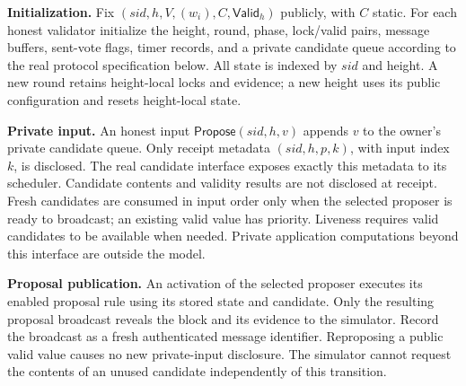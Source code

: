 \documentclass[conference,letterpaper,10pt]{IEEEtran}
\begin{document}
\begin{myframebox}[title={ $\mathcal{F}_{\scriptscriptstyle\mathsf{Tendermint}}$: height and proposal management}]
\textbf{Initialization.} Fix $(sid,h,V,(w_i),C,\mathsf{Valid}_h)$ publicly, with $C$ static. For each honest validator initialize the height, round, phase, lock/valid pairs, message buffers, sent-vote flags, timer records, and a private candidate queue according to the real protocol specification below. All state is indexed by $sid$ and height. A new round retains height-local locks and evidence; a new height uses its public configuration and resets height-local state.

\textbf{Private input.} An honest input $\mathsf{Propose}(sid,h,v)$ appends $v$ to the owner's private candidate queue. Only receipt metadata $(sid,h,p,k)$, with input index $k$, is disclosed. The real candidate interface exposes exactly this metadata to its scheduler. Candidate contents and validity results are not disclosed at receipt. Fresh candidates are consumed in input order only when the selected proposer is ready to broadcast; an existing valid value has priority. Liveness requires valid candidates to be available when needed. Private application computations beyond this interface are outside the model.

\textbf{Proposal publication.} An activation of the selected proposer executes its enabled proposal rule using its stored state and candidate. Only the resulting proposal broadcast reveals the block and its evidence to the simulator. Record the broadcast as a fresh authenticated message identifier. Reproposing a public valid value causes no new private-input disclosure. The simulator cannot request the contents of an unused candidate independently of this transition.
\end{myframebox}
\end{document}

